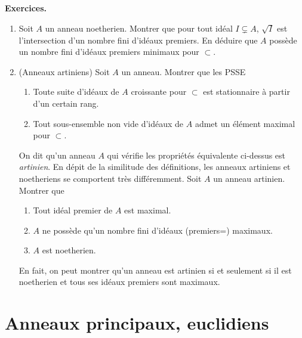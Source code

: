 \documentclass[a4paper, 12pt]{amsart}
\begin{document}
\subsection{}\label{NoethExercices}\textbf{Exercices.}\\
    \begin{enumerate}[leftmargin=* ,parsep=0cm,itemsep=0cm,topsep=0cm]
     \item  Soit $A$ un anneau noetherien. Montrer que pour tout id\'eal  $I\subsetneq A$, $\sqrt{I}$ est l'intersection d'un nombre fini d'id\'eaux premiers. En d\'eduire que $A$ poss\`ede un nombre fini d'id\'eaux premiers minimaux pour $\subset$. \\
     \item   (Anneaux artiniens) Soit $A$ un anneau. Montrer que les PSSE\\
       \begin{enumerate} 
     \item  Toute suite  d'id\'eaux de $A$ croissante pour $\subset$ est stationnaire \`a partir d'un certain rang.
     \item Tout sous-ensemble non vide d'id\'eaux de $A$ admet un \'el\'ement maximal pour $\subset $.\\
\end{enumerate}
\noindent On dit qu'un anneau $A$ qui v\'erifie les propri\'et\'es \'equivalente ci-dessus est \textit{artinien}. En d\'epit de la similitude des d\'efinitions, les anneaux artiniens et noetheriens se comportent tr\`es diff\'eremment. Soit $A$ un anneau artinien. Montrer que\\
 \begin{enumerate} 
     \item  Tout id\'eal premier de $A $ est maximal.
     \item  $A$ ne poss\`ede qu'un nombre fini d'id\'eaux (premiers=) maximaux.
      \item  $A$ est noetherien.\\
\end{enumerate}
En fait, on peut montrer qu'un anneau est artinien si et seulement si il est noetherien et tous ses id\'eaux premiers sont maximaux. 
\end{enumerate}



  \section{Anneaux principaux, euclidiens } 
\end{document}
